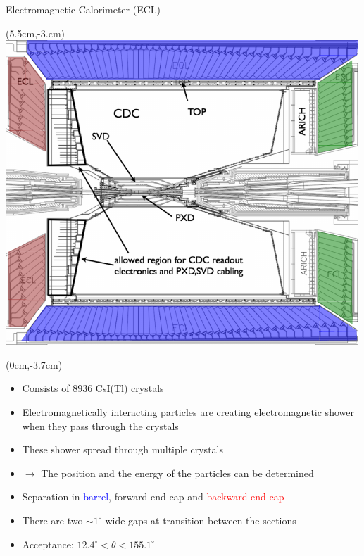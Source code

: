 \documentclass[8pt]{beamer}
\begin{document}
\begin{frame}{Electromagnetic Calorimeter (ECL)}
	\begin{textblock*}{6cm}(5.5cm,-3.cm)
		\includegraphics[width=\textwidth]{VBilder/ecl2}
	\end{textblock*}

\begin{textblock*}{5.2cm}(0cm,-3.7cm)

	\begin{itemize}
		\item Consists of 8936 CsI(Tl) crystals
		\item Electromagnetically interacting particles are  creating electromagnetic shower when they pass through the crystals
		\item[] These shower spread through multiple crystals
		\item[] $\rightarrow$ The position and the energy of the particles can be determined
		\item Separation in \textcolor{blue}{barrel}, \textcolor{OliveGreen}{forward end-cap} and \textcolor{red}{backward end-cap}
		\item There are two $\sim 1^{\circ}$ wide gaps at transition between the sections 
		\item Acceptance: $12.4^{\circ} < \theta < 155.1^{\circ}$ 
	\end{itemize}
\end{textblock*}


\end{frame}
\end{document}

